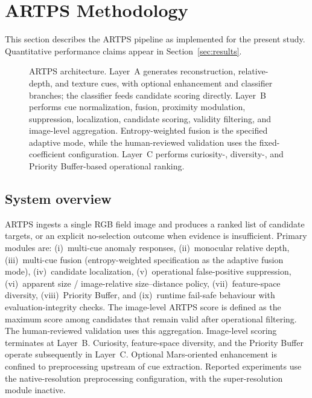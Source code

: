 \section{ARTPS Methodology}
This section describes the ARTPS pipeline as implemented for the present study.
Quantitative performance claims appear in Section~\ref{sec:results}.

\begin{figure}[t]
\centering

\caption{ARTPS architecture.
Layer~A generates reconstruction, relative-depth, and texture cues, with optional
enhancement and classifier branches; the classifier feeds candidate scoring directly.
Layer~B performs cue normalization, fusion, proximity modulation, suppression,
localization, candidate scoring, validity filtering, and image-level aggregation.
Entropy-weighted fusion is the specified adaptive mode, while the human-reviewed
validation uses the fixed-coefficient configuration.
Layer~C performs curiosity-, diversity-, and Priority Buffer-based operational ranking.}
\label{fig:pipeline}
\end{figure}

\subsection{System overview}
ARTPS ingests a single RGB field image and produces a ranked list of candidate targets, or an
explicit no-selection outcome when evidence is insufficient.
Primary modules are: (i)~multi-cue anomaly responses, (ii)~monocular relative depth,
(iii)~multi-cue fusion (entropy-weighted specification as the adaptive fusion mode),
(iv)~candidate localization, (v)~operational false-positive
suppression, (vi)~apparent size / image-relative size--distance policy,
(vii)~feature-space diversity, (viii)~Priority Buffer, and (ix)~runtime fail-safe behaviour
with evaluation-integrity checks.
The image-level ARTPS score is defined as the maximum score among candidates that remain
valid after operational filtering.
The human-reviewed validation uses this aggregation.
Image-level scoring terminates at Layer~B.
Curiosity, feature-space diversity, and the Priority Buffer operate subsequently in Layer~C.
Optional Mars-oriented enhancement is confined to preprocessing upstream of cue extraction.
Reported experiments use the native-resolution preprocessing configuration, with the
super-resolution module inactive.

